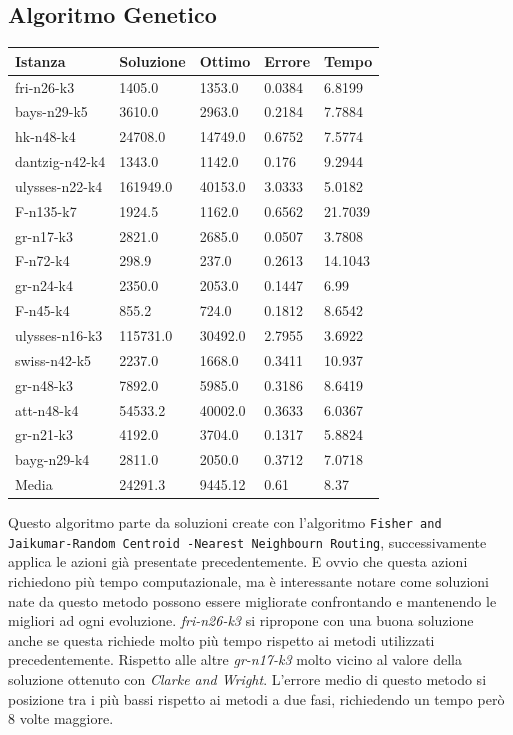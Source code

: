 \documentclass[]{article}
\begin{document}
\subsection{Algoritmo Genetico}

\begin{table}[h!]
	\begin{center}	
		\begin{tabular}{||l | l l l l||} 
			\hline
			Istanza & Soluzione & Ottimo & Errore & Tempo \\ [0.5ex] 
			\hline\hline
			fri-n26-k3 & 1405.0 & 1353.0 &  0.0384 & 6.8199  \\
			bays-n29-k5 & 3610.0 & 2963.0 & 0.2184 & 7.7884  \\
			hk-n48-k4 & 24708.0 & 14749.0 & 0.6752 & 7.5774  \\
			dantzig-n42-k4 & 1343.0 & 1142.0 & 0.176 & 9.2944  \\
			ulysses-n22-k4 & 161949.0 & 40153.0 & 3.0333 & 5.0182  \\
			F-n135-k7 & 1924.5 & 1162.0 & 0.6562 & 21.7039  \\
			gr-n17-k3 & 2821.0 & 2685.0 & \cellcolor{green} 0.0507 & 3.7808  \\	
			F-n72-k4 & 298.9 & 237.0 & 0.2613 & 14.1043  \\
			gr-n24-k4 & 2350.0 & 2053.0 & 0.1447 & 6.99  \\
			F-n45-k4 & 855.2 & 724.0 & 0.1812 & 8.6542  \\
			ulysses-n16-k3 & 115731.0 & 30492.0 & 2.7955 & 3.6922  \\
			swiss-n42-k5 & 2237.0 & 1668.0 & 0.3411 & 10.937  \\
			gr-n48-k3 & 7892.0 & 5985.0 & 0.3186 & 8.6419  \\
			att-n48-k4 & 54533.2 & 40002.0 & 0.3633 & 6.0367  \\
			gr-n21-k3 & 4192.0 & 3704.0 & 0.1317 & 5.8824  \\
			bayg-n29-k4 & 2811.0 & 2050.0 & 0.3712 & 7.0718  \\
			\hline
			Media & 24291.3 & 9445.12 & 0.61 & 8.37  \\
			[1ex] 
			\hline
		\end{tabular}
	\end{center}
\end{table}

Questo algoritmo parte da soluzioni create con l'algoritmo \texttt{Fisher and Jaikumar-Random Centroid -Nearest Neighbourn Routing}, successivamente applica le azioni già presentate precedentemente. E ovvio che questa azioni richiedono più tempo computazionale, ma è interessante notare come soluzioni nate da questo metodo possono essere migliorate confrontando e mantenendo le migliori ad ogni evoluzione. \textit{fri-n26-k3} si ripropone con una buona soluzione anche se questa richiede molto più tempo rispetto ai metodi utilizzati precedentemente. Rispetto alle altre \textit{gr-n17-k3} molto vicino al valore della soluzione ottenuto con \emph{Clarke and Wright}. L'errore medio di questo metodo si posizione tra i più bassi rispetto ai metodi a due fasi, richiedendo un tempo però 8 volte maggiore.
\end{document}
